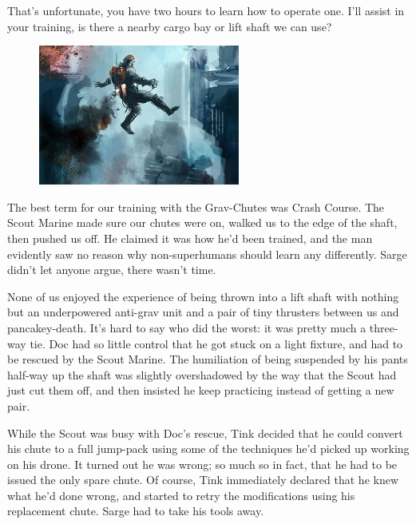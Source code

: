 

That's unfortunate, you have two hours to learn how to operate one. 
I'll assist in your training, is there a nearby cargo bay or lift shaft we can use?



\begin{figure}
	\begin{center}
		\includegraphics[width=\figwidth]{pics/12/25.png}
	\end{center}
\end{figure}
The best term for our training with the Grav-Chutes was Crash Course. 
The Scout Marine made sure our chutes were on, walked us to the edge of the shaft, then pushed us off. 
He claimed it was how he'd been trained, and the man evidently saw no reason why non-superhumans should learn any differently. 
Sarge didn't let anyone argue, there wasn't time.

None of us enjoyed the experience of being thrown into a lift shaft with nothing but an underpowered anti-grav unit and a pair of tiny thrusters between us and pancakey-death. 
It's hard to say who did the worst: 
it was pretty much a three-way tie. 
Doc had so little control that he got stuck on a light fixture, and had to be rescued by the Scout Marine. 
The humiliation of being suspended by his pants half-way up the shaft was slightly overshadowed by the way that the Scout had just cut them off, and then insisted he keep practicing instead of getting a new pair. 


While the Scout was busy with Doc's rescue, Tink decided that he could convert his chute to a full jump-pack using some of the techniques he'd picked up working on his drone. 
It turned out he was wrong; 
so much so in fact, that he had to be issued the only spare chute. 
Of course, Tink immediately declared that he knew what he'd done wrong, and started to retry the modifications using his replacement chute. 
Sarge had to take his tools away.


